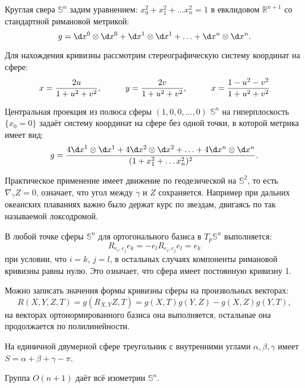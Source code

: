 Круглая свера $\mathbb{S}^n$ задим уравнением: $x_0^2 + x_1^2 + \ldots x_n^2 = 1$ в евклидовом $\mathbb{R}^{n+1}$ со стандартной римановой метрикой:
\begin{equation*}
	g = \d x^0 \otimes \d x^0 + \d x^1 \otimes \d x^1 + \ldots + \d x^n \otimes \d x^n.
\end{equation*}
 
 Для нахождения кривизны рассмотрим стереографическую систему координат на сфере:
 \begin{equation*}
 	x =	\frac{2 u}{1 + u^2 + v^2},
 	\hspace*{1 cm}
 	y =	\frac{2 v}{1 + u^2 + v^2},
 	\hspace*{1 cm}
 	x =	\frac{1 - u^2 - v^2}{1 + u^2 + v^2}
 \end{equation*}

 \begin{to_tas}
 	Центральная проекция из полюса сферы $(1,0,0,\ldots, 0)$ $\mathbb{S}^n$ на гиперплоскость $\{x_0 = 0\}$ задаёт систему координат на сфере без одной точки, в которой метрика имеет вид:
 	\begin{equation*}
 		g = \frac{4 \d x^1 \otimes \d x^1 + 4 \d x^2 \otimes \d x^2 + \ldots + 4 \d x^n \otimes \d x^n}{(1 + x_1^2 + \ldots x_n^2)^2}.
 	\end{equation*}
 \end{to_tas}

Практическое применение имеет движение по геодезической на $\mathbb{S}^2$, то есть $\nabla_{\dot{\gamma}} Z = 0$, означает, что угол между $\dot{\gamma}$ и $Z$ сохраняется. Например при дальних океанских плаваниях важно было держат курс по звездам, двигаясь по так называемой локсодромой.

\begin{to_thr}
	В любой точке сферы $\mathbb{S}^n $ для ортогонального базиса в $T_p \mathbb{S}^n $ выполняется:
	\begin{equation*}
		R_{e_i, e_j} e_k = - e_l R_{e_i,e_j}e_l = e_k
	\end{equation*}
	при условии, что $i=k,\,j=l$, в остальных случаях компоненты римановой кривизны равны нулю. Это означает, что сфера имеет постоянную кривизну 1.
\end{to_thr}

Можно записать значения формы кривизны сферы на произвольных векторах:
\begin{equation*}
	R(X,Y,Z,T) = g(R_{X,Y}Z, T) = g(X,T) g(Y,Z) - g(X,Z) g(Y,T),
\end{equation*}
на векторах ортонормированного базиса она выполняется, остальные она продолжается по полилинейности.

\begin{to_tas}
	На единичной двумерной сфере треугольник с внутренними углами $\alpha, \beta,\gamma$ имеет $S = \alpha + \beta + \gamma -\pi$.
\end{to_tas}

\begin{to_tas}
	Группа $O(n+1)$ даёт всё изометрии $\mathbb{S}^n$.
\end{to_tas}
